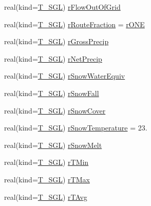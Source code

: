 \begin{DoxyCompactItemize}
\item 
real(kind=\hyperlink{namespacetest_a04d8b9090502de3a00046fe904bc3d99}{T\_\-SGL}) \hyperlink{typetest_1_1_t___c_e_l_l_a78d94efd2cbe0a9b6bbb3d041d6882f7}{rFlowOutOfGrid}
\item 
real(kind=\hyperlink{namespacetest_a04d8b9090502de3a00046fe904bc3d99}{T\_\-SGL}) \hyperlink{typetest_1_1_t___c_e_l_l_a17d29b87df627b1df85222996eaf300a}{rRouteFraction} = \hyperlink{namespacetest_a884b235687921d6a1682ba733422bc2a}{rONE}
\item 
real(kind=\hyperlink{namespacetest_a04d8b9090502de3a00046fe904bc3d99}{T\_\-SGL}) \hyperlink{typetest_1_1_t___c_e_l_l_a8360b2aeb6dabd62774564121921d569}{rGrossPrecip}
\item 
real(kind=\hyperlink{namespacetest_a04d8b9090502de3a00046fe904bc3d99}{T\_\-SGL}) \hyperlink{typetest_1_1_t___c_e_l_l_a654e179184010e5c53d45db26bc398e9}{rNetPrecip}
\item 
real(kind=\hyperlink{namespacetest_a04d8b9090502de3a00046fe904bc3d99}{T\_\-SGL}) \hyperlink{typetest_1_1_t___c_e_l_l_ade6352246523778acc8b0802f262b7bb}{rSnowWaterEquiv}
\item 
real(kind=\hyperlink{namespacetest_a04d8b9090502de3a00046fe904bc3d99}{T\_\-SGL}) \hyperlink{typetest_1_1_t___c_e_l_l_a52f271f7bb83ac52f54d9c86ff2c6d67}{rSnowFall}
\item 
real(kind=\hyperlink{namespacetest_a04d8b9090502de3a00046fe904bc3d99}{T\_\-SGL}) \hyperlink{typetest_1_1_t___c_e_l_l_a39df244c8f6adcab3c9b157b9c5fc726}{rSnowCover}
\item 
real(kind=\hyperlink{namespacetest_a04d8b9090502de3a00046fe904bc3d99}{T\_\-SGL}) \hyperlink{typetest_1_1_t___c_e_l_l_a1d63bbded70f8f71a6779c3f9e9a00b5}{rSnowTemperature} = 23.
\item 
real(kind=\hyperlink{namespacetest_a04d8b9090502de3a00046fe904bc3d99}{T\_\-SGL}) \hyperlink{typetest_1_1_t___c_e_l_l_a81dc5eb4051adcf0cf4a86fd72d50e54}{rSnowMelt}
\item 
real(kind=\hyperlink{namespacetest_a04d8b9090502de3a00046fe904bc3d99}{T\_\-SGL}) \hyperlink{typetest_1_1_t___c_e_l_l_a30033b5719a44b95d9bcdafeaa44eb1b}{rTMin}
\item 
real(kind=\hyperlink{namespacetest_a04d8b9090502de3a00046fe904bc3d99}{T\_\-SGL}) \hyperlink{typetest_1_1_t___c_e_l_l_aa9a66e60be3aa56c12f7646c937b535e}{rTMax}
\item 
real(kind=\hyperlink{namespacetest_a04d8b9090502de3a00046fe904bc3d99}{T\_\-SGL}) \hyperlink{typetest_1_1_t___c_e_l_l_a5a5e54909178e03013819b94cfcab747}{rTAvg}

\end{DoxyCompactItemize}
